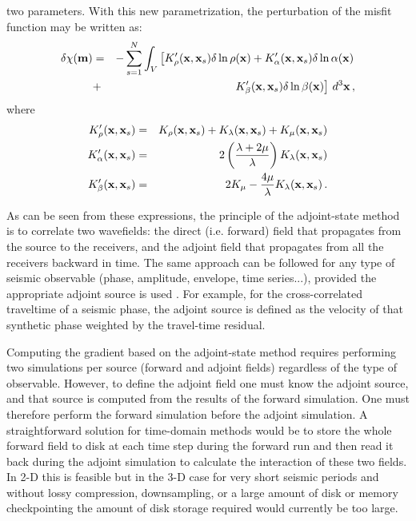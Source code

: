 two parameters. With this new parametrization, the perturbation of the misfit function may be written as:
\begin{eqnarray}
\delta\chi(\mathbf{m}) & = & - \sum_{s=1}^N\nonumber \int_V \left[ K'_\rho(\mathbf{x},\mathbf{x}_s)\delta\ln\rho(\mathbf{x})
+K'_\alpha(\mathbf{x},\mathbf{x}_s)\delta\ln\alpha(\mathbf{x}) \right. \nonumber \\
& + & \left. K'_\beta(\mathbf{x},\mathbf{x}_s)\delta\ln\beta(\mathbf{x})\right] \, d^3\mathbf{x} \, ,
\end{eqnarray}
where
\begin{eqnarray}
K'_\rho(\mathbf{x},\mathbf{x}_s) & = &  K_\rho(\mathbf{x},\mathbf{x}_s)+K_\lambda(\mathbf{x},\mathbf{x}_s)+K_\mu(\mathbf{x},\mathbf{x}_s) \\
K'_\alpha(\mathbf{x},\mathbf{x}_s) & = &  2 \left(\frac{\lambda+2\mu}{\lambda}\right) K_\lambda(\mathbf{x},\mathbf{x}_s) \\
K'_\beta(\mathbf{x},\mathbf{x}_s) & = & 2 K_\mu -\frac{4\mu}{\lambda} K_\lambda (\mathbf{x},\mathbf{x}_s) \, .
\end{eqnarray}

As can be seen from these expressions, the principle of the adjoint-state method is to correlate two wavefields:
the direct (i.e. forward) field that propagates from the source to the receivers, and the adjoint field that propagates from all the
receivers backward in time. The same approach can be followed for any type of seismic observable (phase, amplitude,
envelope, time series...), provided the appropriate adjoint source is used \cite[]{TrTaLi05,TrKoLi08}.
For example, for the cross-correlated traveltime of a seismic
phase, the adjoint source is defined as the velocity of that synthetic phase weighted by the travel-time residual.\newline


Computing the gradient based on the adjoint-state method requires performing two simulations per source (forward and adjoint
fields) regardless of the type of observable. However, to define the adjoint field one
must know the adjoint source, and that source is computed from the results of the forward simulation. One must therefore perform
the forward simulation before the adjoint simulation.
A straightforward solution for time-domain methods would be to store the whole forward field to disk at
each time step during the forward run and then read it back during the adjoint simulation to calculate the interaction of these two fields.
In 2-D this is feasible but in the 3-D case for very short seismic periods and without lossy compression, downsampling,
or a large amount of disk or memory checkpointing \cite[e.g.,][]{FiKeIg09,RuHaPuGu14,CyShWi15}
the amount of disk storage required would currently be too large.\newline


